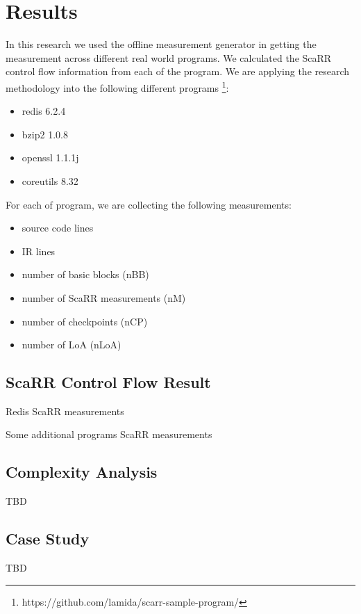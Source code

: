 
\chapter{Results} %

\label{Chapter5} %

In this research we used the offline measurement generator in getting the measurement across different real world programs. We calculated the ScaRR control flow information from each of the program. We are applying the research methodology into the following different programs \footnote{https://github.com/lamida/scarr-sample-program/}:

\begin{itemize}
    \item redis 6.2.4
    \item bzip2 1.0.8
    \item openssl 1.1.1j
    \item coreutils 8.32
\end{itemize}

For each of program, we are collecting the following measurements:

\begin{itemize}
    \item source code lines
    \item IR lines
    \item number of basic blocks (nBB)
    \item number of ScaRR measurements (nM)
    \item number of checkpoints (nCP)
    \item number of LoA (nLoA)
\end{itemize}

\section{ScaRR Control Flow Result}



\begin{table}[hbtp]
    \centering
    \caption{Redis ScaRR measurements}
\end{table}

\begin{table}[hbtp]
    \centering
    \caption{Some additional programs ScaRR measurements}
\end{table}

\section{Complexity Analysis}

TBD

\section{Case Study}

TBD